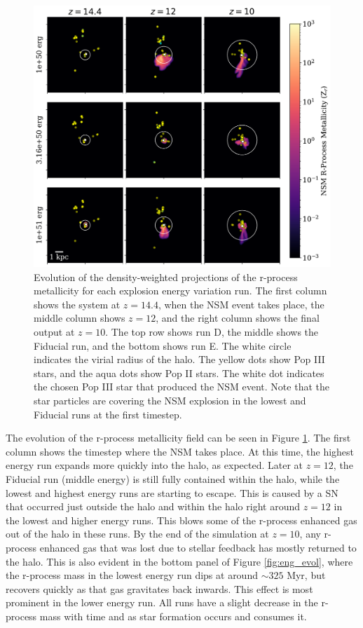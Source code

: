 \documentclass[fleqn,usenatbib]{mnras}
\begin{document}
\begin{figure} 
	\includegraphics[width=\textwidth]{plots/eng_NSM_evolution.pdf}
	\caption[R-process metallicity projections of the explosion energy variation runs through time.]{Evolution of the density-weighted projections of the r-process metallicity for each explosion energy variation run. The first column shows the system at $z = 14.4$, when the NSM event takes place, the middle column shows $z = 12$, and the right column shows the final output at $z = 10$. The top row shows run D, the middle shows the Fiducial run, and the bottom shows run E. The white circle indicates the virial radius of the halo. The yellow dots show Pop III stars, and the aqua dots show Pop II stars. The white dot indicates the chosen Pop III star that produced the NSM event. Note that the star particles are covering the NSM explosion in the lowest and Fiducial runs at the first timestep.}
	\label{fig:eng_met4_evol}
\end{figure}
The evolution of the r-process metallicity field can be seen in Figure \ref{fig:eng_met4_evol}. The first column shows the timestep where the NSM takes place. At this time, the highest energy run expands more quickly into the halo, as expected. Later at $z = 12$, the Fiducial run (middle energy) is still fully contained within the halo, while the lowest and highest energy runs are starting to escape. This is caused by a SN that occurred just outside the halo and within the halo right around $z = 12$ in the lowest and higher energy runs. This blows some of the r-process enhanced gas out of the halo in these runs. By the end of the simulation at $z = 10$, any r-process enhanced gas that was lost due to stellar feedback has mostly returned to the halo. This is also evident in the bottom panel of Figure \ref{fig:eng_evol}, where the r-process mass in the lowest energy run dips at around $\sim 325$ Myr, but recovers quickly as that gas gravitates back inwards. This effect is most prominent in the lower energy run. All runs have a slight decrease in the r-process mass with time and as star formation occurs and consumes it.
\end{document}
